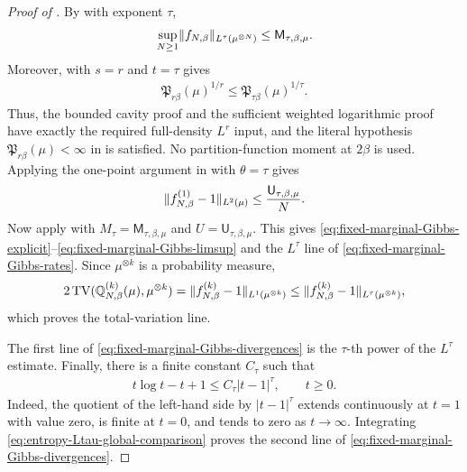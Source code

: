 \documentclass[11pt,reqno]{amsart}
\numberwithin{equation}{section}
\theoremstyle{plain}
\theoremstyle{remark}
\DeclarePairedDelimiter{\pa}{\lparen}{\rparen}
\DeclarePairedDelimiter{\norm}{\lVert}{\rVert}
\newcommand{\Q}{{\mathbb{Q}}}
\newcommand{\be}{\beta}
\newcommand{\TV}{\operatorname{TV}}
\begin{document}
\begin{proof}[Proof of ]
By  with exponent \(\tau\),
\begin{align}\label{eq:fixed-marginal-full-Gibbs-Ltau}
 \sup_{N\ge1}\norm{f_{N,\be}}_{L^\tau(\mu^{\otimes N})}
 \le \mathsf M_{\tau,\be,\mu}.
\end{align}
Moreover,  with \(s=r\) and \(t=\tau\) gives
\begin{align}\label{eq:fixed-marginal-rbeta-input}
 \mathfrak P_{r\be}(\mu)^{1/r}
 \le \mathfrak P_{\tau\be}(\mu)^{1/\tau}.
\end{align}
Thus, the bounded cavity proof and the sufficient weighted logarithmic proof have exactly the required full-density \(L^r\) input, and the literal hypothesis \(\mathfrak P_{r\be}(\mu)<\infty\) in  is satisfied.  No partition-function moment at \(2\be\) is used.  Applying the one-point argument in  with \(\theta=\tau\) gives
\begin{align}\label{eq:fixed-marginal-one-point-L2}
 \norm{f_{N,\be}^{(1)}-1}_{L^2(\mu)}
 \le\frac{\mathsf U_{\tau,\be,\mu}}{N}.
\end{align}
Now apply  with \(M_\tau=\mathsf M_{\tau,\be,\mu}\) and \(U=\mathsf U_{\tau,\be,\mu}\).  This gives \eqref{eq:fixed-marginal-Gibbs-explicit}--\eqref{eq:fixed-marginal-Gibbs-limsup} and the \(L^\tau\) line of \eqref{eq:fixed-marginal-Gibbs-rates}.  Since \(\mu^{\otimes k}\) is a probability measure,
\begin{align}\label{eq:fixed-marginal-TV-from-Ltau}
 2\TV\pa{\Q_{N,\be}^{(k)}(\mu),\mu^{\otimes k}}
 =\norm{f_{N,\be}^{(k)}-1}_{L^1(\mu^{\otimes k})}
 \le\norm{f_{N,\be}^{(k)}-1}_{L^\tau(\mu^{\otimes k})},
\end{align}
which proves the total-variation line.

The first line of \eqref{eq:fixed-marginal-Gibbs-divergences} is the \(\tau\)-th power of the \(L^\tau\) estimate.  Finally, there is a finite constant \(C_\tau\) such that
\begin{align}\label{eq:entropy-Ltau-global-comparison}
 t\log t-t+1\le C_\tau|t-1|^\tau,
 \qquad t\ge0.
\end{align}
Indeed, the quotient of the left-hand side by \(|t-1|^\tau\) extends continuously at \(t=1\) with value zero, is finite at \(t=0\), and tends to zero as \(t\to\infty\).  Integrating \eqref{eq:entropy-Ltau-global-comparison} proves the second line of \eqref{eq:fixed-marginal-Gibbs-divergences}.
\end{proof}
\end{document}
